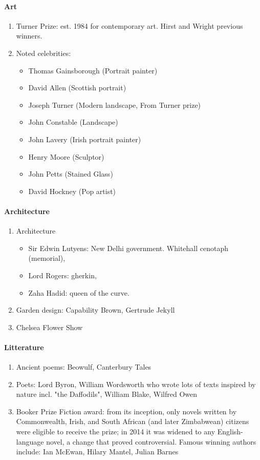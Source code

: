 \documentclass{amsart}
\begin{document}
\paragraph{Art}

\begin{enumerate}
\item Turner Prize: est. 1984 for contemporary art. Hirst and Wright previous winners. 
\item Noted celebrities:
\begin{itemize}
\item Thomas Gainsborough (Portrait painter)
\item David Allen (Scottish portrait)
\item Joseph Turner (Modern landscape, From Turner prize)
\item John Constable (Landscape)
\item John Lavery (Irish portrait painter)
\item Henry Moore (Sculptor)
\item John Petts (Stained Glass)
\item David Hockney (Pop artist)
\end{itemize}
\end{enumerate}


\paragraph{Architecture}

\begin{enumerate}
\item Architecture
	\begin{itemize}
			\item Sir Edwin Lutyens: New Delhi government. Whitehall cenotaph (memorial),
			\item Lord Rogers: gherkin,
			\item Zaha Hadid: queen of the curve.
	\end{itemize}
\item Garden design: Capability Brown, Gertrude Jekyll
\item Chelsea Flower Show
\end{enumerate}


\paragraph{Litterature}
\begin{enumerate}
\item Ancient poems: Beowulf, Canterbury Tales
\item Poets: Lord Byron, William Wordsworth who wrote lots of texts inspired by nature incl. "the Daffodils", William Blake, Wilfred Owen
\item Booker Prize Fiction award: from its inception, only novels written by Commonwealth, Irish, and South African (and later Zimbabwean) citizens were eligible to receive the prize; in 2014 it was widened to any English-language novel, a change that proved controversial. Famous winning authors include: Ian McEwan, Hilary Mantel, Julian Barnes
\end{enumerate}
\end{document}
